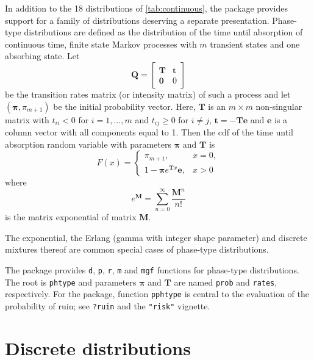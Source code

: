 \documentclass[x11names]{article}
\newcommand{\mat}[1]{\bm{#1}}
\newcommand{\code}[1]{\texttt{#1}}
\begin{document}
In addition to the 18 distributions of \autoref{tab:continuous},
the package provides support for a family of distributions deserving a
separate presentation. Phase-type distributions \citep{Neuts_81} are
defined as the distribution of the time until absorption of continuous
time, finite state Markov processes with $m$ transient states and one
absorbing state. Let
\begin{equation}
  \label{eq:Markov-transition-matrix}
  \mat{Q} =
  \begin{bmatrix}
    \mat{T} & \mat{t} \\
    \mat{0} & 0
  \end{bmatrix}
\end{equation}
be the transition rates matrix (or intensity matrix) of such a process
and let $(\pmb{\pi}, \pi_{m + 1})$ be the initial probability vector.
Here, $\mat{T}$ is an $m \times m$ non-singular matrix with $t_{ii} <
0$ for $i = 1, \dots, m$ and $t_{ij} \geq 0$ for $i \neq j$, $\mat{t}
= - \mat{T} \mat{e}$ and $\mat{e}$ is a column vector with all
components equal to 1. Then the cdf of the time until absorption
random variable with parameters $\pmb{\pi}$ and $\mat{T}$ is
\begin{equation}
  \label{eq:cdf-phtype}
  F(x) =
  \begin{cases}
    \pi_{m + 1}, & x = 0, \\
    1 - \pmb{\pi} e^{\mat{T} x} \mat{e}, & x > 0
  \end{cases}
\end{equation}
where
\begin{equation}
  \label{eq:matrix-exponential}
  e^{\mat{M}} = \sum_{n = 0}^\infty \frac{\mat{M}^n}{n!}
\end{equation}
is the matrix exponential of matrix $\mat{M}$.

The exponential, the Erlang (gamma with integer shape parameter) and
discrete mixtures thereof are common special cases of phase-type
distributions.

The package provides \code{d}, \code{p}, \code{r}, \code{m} and
\code{mgf} functions for phase-type distributions. The root is
\code{phtype} and parameters $\mat{\pi}$ and $\mat{T}$ are named
\code{prob} and \code{rates}, respectively. For the package, function
\code{pphtype} is central to the evaluation of the probability of
ruin; see \code{?ruin} and the \code{"risk"} vignette.


\section{Discrete distributions}
\label{sec:discrete}
\end{document}
